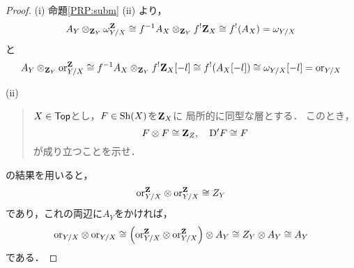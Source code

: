 \begin{proof}
    (i) 
    命題\ref{PRP:subm} (ii) より，
    \begin{align*}
        A_Y\otimes_{\mathbf{Z}_Y}\omega_{Y/X}^{\mathbf{Z}} 
        \cong
        f^{-1}A_X\otimes_{\mathbf{Z}_Y}f^!\mathbf{Z}_X
        \cong
        f^!(A_X)=\omega_{Y/X}
    \end{align*}
    と
    \begin{align*}
        A_Y\otimes_{\mathbf{Z}_Y}\mathord{\mathrm{or}}_{Y/X}^{\mathbf{Z}} 
        \cong
        f^{-1}A_X\otimes_{\mathbf{Z}_Y}f^!\mathbf{Z}_X[-l]
        \cong
        f^!(A_X[-l])
        \cong
        \omega_{Y/X}[-l]
        =\mathord{\mathrm{or}}_{Y/X}
    \end{align*}

    (ii) 
    \cite[Exercise III.3]{KS90}\begin{quote}
        \(X\in\textsf{Top}\)とし，\(F\in\mathrm{Sh}(X)\)を\(\mathbf{Z}_X\)に
        局所的に同型な層とする．
        このとき，\[
            F\otimes F\cong \mathbf{Z}_Z,\quad \mathrm{D}'F\cong F
        \]が成り立つことを示せ．
    \end{quote}
    の結果を用いると，\[
        \mathord{\mathrm{or}}_{Y/X}^{\mathbf{Z}}\otimes \mathord{\mathrm{or}}_{Y/X}^{\mathbf{Z}}\cong Z_Y
    \]であり，これの両辺に\(A_Y\)をかければ，
    \[
        \mathord{\mathrm{or}}_{Y/X}\otimes \mathord{\mathrm{or}}_{Y/X}
        \cong
        \left(\mathord{\mathrm{or}}_{Y/X}^{\mathbf{Z}}\otimes \mathord{\mathrm{or}}_{Y/X}^{\mathbf{Z}}\right)\otimes A_Y
        \cong Z_Y\otimes A_Y
        \cong A_Y
    \]
    である．


\end{proof}
